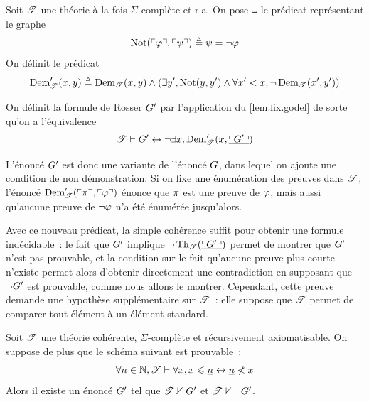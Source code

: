 \begin{definition}
  Soit $\mathscr T$ une théorie à la fois $\Sigma$-complète et r.a. On pose $\Not$
  le prédicat représentant le graphe
  \[\operatorname{Not}(\ulcorner\varphi\urcorner, \ulcorner\psi\urcorner) \triangleq \psi = \lnot \varphi\]
  On définit le prédicat
  \[\operatorname{Dem}'_{\mathscr T}(x,y) \triangleq \operatorname{Dem}_{\mathscr T}(x,y) \land
  (\exists y', \operatorname{Not}(y,y') \land \forall x' < x,
  \lnot \operatorname{Dem}_{\mathscr T}(x',y'))\]

  On définit la formule de Rosser $G'$ par l'application du
  \cref{lem.fix.godel} de sorte qu'on a l'équivalence
  \[\mathscr T \vdash G' \mathrel{\leftrightarrow} \lnot
  \exists x, \operatorname{Dem}'_{\mathscr T}(x, \underline{\ulcorner G'\urcorner})\]
\end{definition}

L'énoncé $G'$ est donc une variante de l'énoncé $G$, dans lequel on
ajoute une condition de non démonstration. Si on fixe une énumération des
preuves dans $\mathscr T$, l'énoncé
$\operatorname{Dem}'_{\mathscr T}(\ulcorner\pi\urcorner, \ulcorner\varphi\urcorner)$
énonce que $\pi$ est une preuve de $\varphi$, mais aussi qu'aucune preuve de
$\lnot \varphi$ n'a été énumérée jusqu'alors.

Avec ce nouveau prédicat, la simple cohérence suffit pour obtenir une formule
indécidable~: le fait que $G'$ implique
$\lnot\operatorname{Th}_{\mathscr T}(\underline{\ulcorner G'\urcorner})$ permet de montrer que $G'$
n'est pas prouvable, et la condition sur le fait qu'aucune preuve plus courte
n'existe permet alors d'obtenir directement une contradiction en supposant que
$\lnot G'$ est prouvable, comme nous allons le montrer. Cependant, cette
preuve demande une hypothèse supplémentaire sur $\mathscr T$~: elle suppose que
$\mathscr T$ permet de comparer tout élément à un élément standard.

\begin{theorem}
  \label{thm.godel.rosser}
  Soit $\mathscr T$ une théorie cohérente, $\Sigma$-complète et récursivement
  axiomatisable. On suppose de plus que le schéma suivant est prouvable~:
  \[\forall n \in \mathbb N, \mathscr T \vdash \forall x,
  x \leqslant \underline{n} \mathrel{\leftrightarrow} \underline{n} \nless x \]
  Alors il existe un énoncé $G'$ tel que $\mathscr T \nvdash G'$ et
  $\mathscr T \nvdash \lnot G'$.
\end{theorem}

